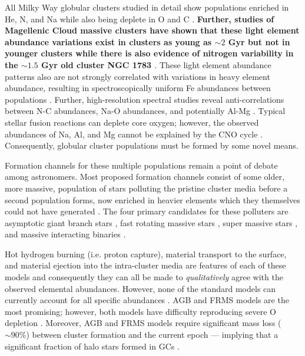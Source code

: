 All Milky Way globular clusters studied in detail show populations enriched in
He, N, and Na while also being deplete in O and C
\citep{Piotto2015,Bastian2018}. {\bf Further, studies of Magellenic Cloud
massive clusters have shown that these light element abundance variations exist
in clusters as young as $\sim 2$ Gyr but not in younger clusters
\citep{Martocchia2019} while there is also evidence of nitrogen variability in
the $\sim 1.5$ Gyr old cluster NGC 1783 \citep{Cadelano2022}}.  These light
element abundance patterns also are not strongly correlated with variations in
heavy element abundance, resulting in spectroscopically uniform Fe abundances
between populations \citep[{\bf though recent work indicates that there may be
[Fe/H] variations within the first population, e.g.}][]{Legnardi2022,
Lardo2022} . Further, high-resolution spectral studies reveal anti-correlations
between N-C abundances, Na-O abundances, and potentially Al-Mg
\citep{Sneden1992, Gratton2012}. Typical stellar fusion reactions can deplete
core oxygen; however, the observed abundances of Na, Al, and Mg cannot be
explained by the CNO cycle \citep{Prantzos2007}. Consequently, globular cluster
populations must be formed by some novel means.

Formation channels for these multiple populations remain a point of debate
among astronomers. Most proposed formation channels consist of some older,
more massive, population of stars polluting the pristine cluster media before a
second population forms, now enriched in heavier elements which they themselves could
not have generated \citep[for a detailed review see ][]{Gratton2012}. The four
primary candidates for these polluters are asymptotic giant branch stars
\citep[AGBs,][]{Ventura2001,DErcole2010}, fast rotating massive stars
\citep[FRMSs,][]{Decressin2007}, super massive stars
\citep[SMSs,][]{Denissenkov2014}, and massive interacting binaries
\citep[MIBs,][]{deMink2009, Bastian2018}. 

Hot hydrogen burning (i.e. proton capture), material transport to the surface, and
material ejection into the intra-cluster media are features of each of these
models and consequently they can all be made to {\it qualitatively} agree with
the observed elemental abundances. However, none of the standard models can
currently account for all specific abundances \citep{Gratton2012}. AGB and FRMS
models are the most promising; however, both models have difficulty reproducing
severe O depletion \citep{Ventura2009,Decressin2007}. Moreover, AGB and FRMS
models require significant mass loss ($\sim 90\%$) between cluster formation
and the current epoch --- implying that a significant fraction of halo stars
formed in GCs \citep{Renzini2008,DErcole2008,Bastian2015}.

